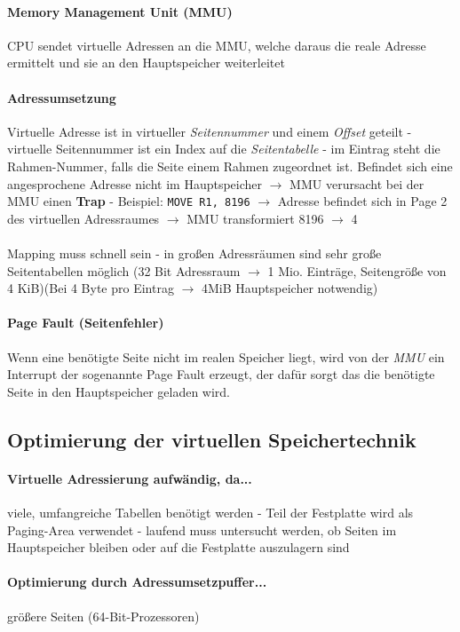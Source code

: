 \documentclass[11pt,a4paper,landscape]{article}
\begin{document}
\begin{multicols*}{3}
	\paragraph{Memory Management Unit (MMU)} CPU sendet virtuelle Adressen an die MMU, welche daraus die reale Adresse ermittelt und sie an den Hauptspeicher weiterleitet
	\paragraph{Adressumsetzung} Virtuelle Adresse ist in virtueller \textit{Seitennummer} und einem \textit{Offset} geteilt - virtuelle Seitennummer ist ein Index auf die \textit{Seitentabelle} - im Eintrag steht die Rahmen-Nummer, falls die Seite einem Rahmen zugeordnet ist. Befindet sich eine angesprochene Adresse nicht im Hauptspeicher $\rightarrow$ MMU verursacht bei der MMU einen \textbf{Trap} - Beispiel: \texttt{MOVE R1, 8196} $\rightarrow$ Adresse befindet sich in Page 2 des virtuellen Adressraumes $\rightarrow$ MMU transformiert 8196 $\rightarrow$ 4\\\\
	Mapping muss schnell sein - in großen Adressräumen sind sehr große Seitentabellen möglich (32 Bit Adressraum $\rightarrow$ 1 Mio. Einträge, Seitengröße von 4 KiB)(Bei 4 Byte pro Eintrag $\rightarrow$ 4MiB Hauptspeicher notwendig)
	\paragraph{Page Fault (Seitenfehler)} Wenn eine benötigte Seite nicht im realen Speicher liegt, wird von der \textit{MMU} ein Interrupt der sogenannte Page Fault erzeugt, der dafür sorgt das die benötigte Seite in den Hauptspeicher geladen wird.
	\subsection{Optimierung der virtuellen Speichertechnik}
	\paragraph{Virtuelle Adressierung aufwändig, da...} viele, umfangreiche Tabellen benötigt werden - Teil der Festplatte wird als Paging-Area verwendet - laufend muss untersucht werden, ob Seiten im Hauptspeicher bleiben oder auf die Festplatte auszulagern sind
	\paragraph{Optimierung durch Adressumsetzpuffer...} größere Seiten (64-Bit-Prozessoren)

\end{multicols*}
\end{document}
